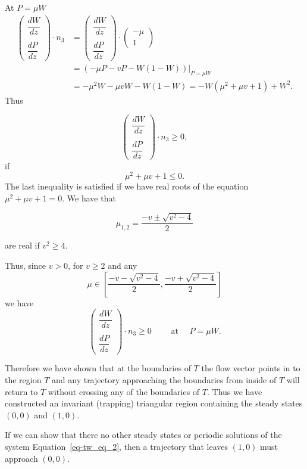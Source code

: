 \documentclass[
  letterpaper,
  DIV=11,
  numbers=noendperiod]{scrreprt}
\theoremstyle{definition}
\theoremstyle{plain}
\theoremstyle{plain}
\theoremstyle{remark}
\begin{document}
At \(P=\mu W\) \[
\begin{aligned}
\begin{pmatrix} 
\dfrac{ dW}{dz} \\  \\ \dfrac{dP}{dz}
\end{pmatrix} \cdot n_3 &= \begin{pmatrix} 
\dfrac{ dW}{dz} \\  \\ \dfrac{dP}{dz}
\end{pmatrix}\cdot  \begin{pmatrix} 
-\mu \\ 1
\end{pmatrix} \\
& =\left(  - \mu  P - vP -  W(1-W)\right) \Big|_{P=\mu W}  \\
&=   - \mu^2 W - \mu v W - W(1-W) = - W( \mu^2 + \mu v + 1) + W^2.
\end{aligned}
\] Thus

\[
\begin{pmatrix} 
\dfrac{ dW}{dz} \\  \\ \dfrac{dP}{dz}
\end{pmatrix} \cdot n_3 \geq 0,
\] if \[
\mu^2 + \mu v + 1 \leq 0.
\] The last inequality is satisfied if we have real roots of the
equation \(\mu^2 + \mu v + 1 = 0\). We have that

\[
\mu_{1,2} = \frac{ - v \pm \sqrt{ v^2 -4}} 2
\]

are real if \(v^2 \geq 4\).

Thus, since \(v >0\), for \(v \geq 2\) and any \[
\mu\in \left[ \dfrac{ - v -\sqrt{ v^2 -4}} 2, \dfrac{ - v +\sqrt{ v^2 -4}} 2 \right]
\] we have \[
\begin{pmatrix} 
\dfrac{ dW}{dz} \\  \\ \dfrac{dP}{dz}
\end{pmatrix} \cdot n_3 \geq 0 \qquad \text{ at } \quad P=\mu W. 
\]

Therefore we have shown that at the boundaries of \(T\) the flow vector
points in to the region \(T\) and any trajectory approaching the
boundaries from inside of \(T\) will return to \(T\) without crossing
any of the boundaries of \(T\). Thus we have constructed an invariant
(trapping) triangular region containing the steady states \((0,0)\) and
\((1,0)\).

If we can show that there no other steady states or periodic solutions
of the system Equation~\ref{eq-tw_eq_2}, then a trajectory that leaves
\((1,0)\) must approach \((0,0)\).
\end{document}
